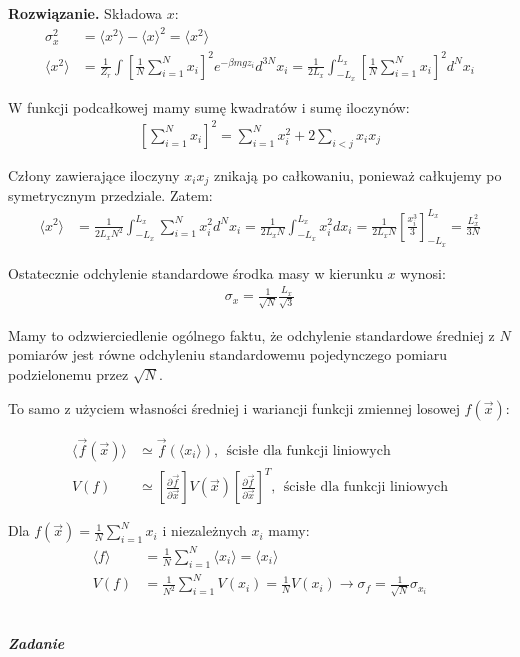 \documentclass[11pt,a4paper]{article}
\newcounter{zadanie}\newcommand{\zadanie}[1][]{\addtocounter{zadanie}{1} ~\\  {\bf \emph{Zadanie \arabic{zadanie} #1 }} \\}
\newenvironment{solution}{\vspace{1cm} \par\textbf{Rozwiązanie.} \vspace{1cm}}{}
\begin{document}
\begin{solution}
Składowa $x$:
\begin{align*}
  \sigma_{x}^{2} &= \langle x^2 \rangle - \langle x \rangle^2 = \langle x^2 \rangle \\
  \langle x^2 \rangle &= \frac{1}{Z_{r}} \int \left[\frac{1}{N} \sum_{i=1}^{N} x_i \right]^{2} e^{-\beta mgz_i} d^{3N}x_i = 
  \frac{1}{2L_{x}} \int_{-L_{x}}^{L_{x}} \left[\frac{1}{N}  \sum_{i=1}^{N} x_i \right]^{2} d^{N}x_i
\end{align*}

W funkcji podcałkowej mamy sumę kwadratów i sumę iloczynów:
\begin{align*}
  \left[\sum_{i=1}^{N} x_i \right]^{2} = \sum_{i=1}^{N} x_i^2 + 2 \sum_{i<j} x_i x_j
\end{align*}

Człony zawierające iloczyny $x_i x_j$ znikają po całkowaniu, 
ponieważ całkujemy po symetrycznym przedziale. Zatem:
\begin{align*}
  \langle x^2 \rangle &= \frac{1}{2L_{x}N^{2}} \int_{-L_{x}}^{L_{x}} \sum_{i=1}^{N} x_i^2 d^{N}x_i = 
  \frac{1}{2L_{x}N} \int_{-L_{x}}^{L_{x}} x_i^2 dx_i = \frac{1}{2L_{x}N} \left[ \frac{x_i^3}{3} \right]_{-L_{x}}^{L_{x}} = 
  \frac{L_{x}^2}{3N}
\end{align*}

Ostatecznie odchylenie standardowe środka masy w kierunku $x$ wynosi:
\begin{align*}
  \sigma_{x} = \frac{1}{\sqrt{N}} \frac{L_{x}}{\sqrt{3}}
\end{align*}


Mamy to odzwierciedlenie ogólnego faktu, że odchylenie standardowe średniej 
z $N$ pomiarów jest równe odchyleniu standardowemu pojedynczego pomiaru 
podzielonemu przez $\sqrt{N}$. 

To samo z użyciem własności średniej i wariancji funkcji 
zmiennej losowej $f(\vec{x})$:


\begin{align*}
  \langle \vec{f}(\vec{x}) \rangle &\simeq \vec{f}(\langle x_i \rangle),~~\text{ścisłe dla funkcji liniowych} \\
  V(f) & \simeq \left[\frac{\partial \vec{f}}{\partial \vec{x}}\right] V(\vec{x})  \left[\frac{\partial \vec{f}}{\partial \vec{x}} \right]^{T},~~\text{ścisłe dla funkcji liniowych}
\end{align*}

Dla $f(\vec{x}) = \frac{1}{N} \sum_{i=1}^{N} x_i$ i niezależnych $x_{i}$ mamy:
\begin{align*}
  \langle f \rangle &= \frac{1}{N} \sum_{i=1}^{N} \langle x_i \rangle = \langle x_i \rangle \\
  V(f) &= \frac{1}{N^2} \sum_{i=1}^{N} V(x_i) = \frac{1}{N} V(x_i) \to \sigma_{f} = \frac{1}{\sqrt{N}} \sigma_{x_i}
\end{align*}


\newpage   
\end{solution}
\zadanie[]
\end{document}
